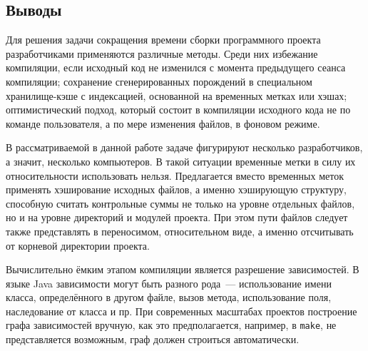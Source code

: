 \subsection{Выводы}
Для решения задачи сокращения времени сборки программного проекта разработчиками применяются различные методы. Среди них избежание компиляции, если исходный код не изменился с момента предыдущего сеанса компиляции; сохранение сгенерированных порождений в специальном хранилище-кэше с индексацией, основанной на временных метках или хэшах; оптимистический подход, который состоит в компиляции исходного кода не по команде пользователя, а по мере изменения файлов, в фоновом режиме.

В рассматриваемой в данной работе задаче фигурируют несколько разработчиков, а значит, несколько компьютеров. В такой ситуации временные метки в силу их относительности использовать нельзя. Предлагается вместо временных меток применять хэширование исходных файлов, а именно хэширующую структуру, способную считать контрольные суммы не только на уровне отдельных файлов, но и на уровне директорий и модулей проекта. При этом пути файлов следует также представлять в переносимом, относительном виде, а именно отсчитывать от корневой директории проекта.

Вычислительно ёмким этапом компиляции является разрешение зависимостей. В языке Java зависимости могут быть разного рода~--- использование имени класса, определённого в другом файле, вызов метода, использование поля, наследование от класса и пр. При современных масштабах проектов построение графа зависимостей вручную, как это предполагается, например, в \texttt{make}, не представляется возможным, граф должен строиться автоматически.